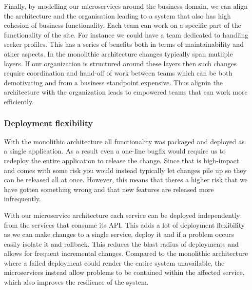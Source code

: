 Finally, by modelling our microservices around the business domain, we can align the architecture
and the organisation leading to a system that also has high cohesion of business functionality.
Each team can work on a specific part of the functionality of the site. For instance we could
have a team dedicated to handling seeker profiles.
This has a series of benefits both in terms of maintainability and other aspects.
In the monolithic architecture changes typically span mutliple layers.
If our organization is structured around these layers then such changes require
coordination and hand-off of work between teams which can be both demotivating and
from a business standpoint expensive.
Thus alignin the architecture with the organization leads to empowered teams that
can work more efficiently.





\subsubsection{Deployment flexibility}

With the monolithic architecture all functionality was packaged and deployed as a single application.
As a result even a one-line bugfix would require us to redeploy the entire application to release the change.
Since that is high-impact and comes with some risk you would instead typically let changes pile up
so they can be released all at once. However, this means that theres a higher risk that we have
gotten something wrong and that new features are released more infrequently.

With our microservice architecture each service can be deployed independently from the services that consume its API.
This adds a lot of deployment flexibility as we can make changes to a single service, deploy it and 
if a problem occurs easily isolate it and rollback.
This reduces the blast radius of deployments and allows for frequent incremental changes.
Compared to the monolithic architecture where a failed deployment could render the entire system unavailable,
the microservices instead allow problems to be contained within the affected service, which also improves the resilience of the system.

